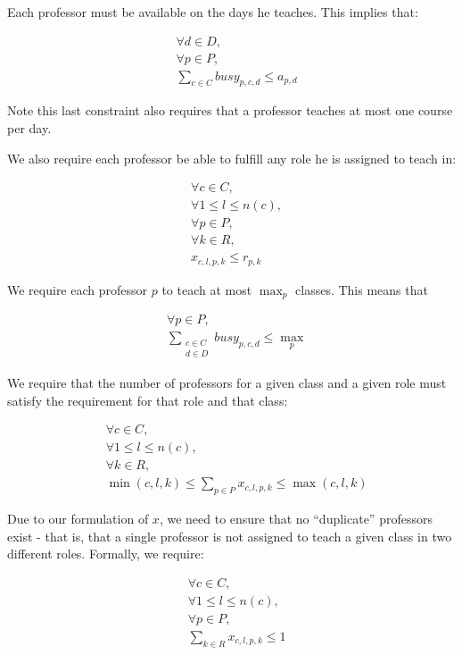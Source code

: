 Each professor must be available on the days he teaches. This implies that:

\begin{align} \label{eq:availability}
  &\forall d \in D,\\
  &\forall p \in P,\\
  &\sum_{c \in C} busy_{p, c, d} \le a_{p, d}
\end{align}

Note this last constraint also requires that a professor teaches at most one course per day.

We also require each professor be able to fulfill any role he is assigned to teach in:

\begin{align} \label{eq:rolevalidity}
  &\forall c \in C,\\
  &\forall 1 \le l \le n(c),\\
  &\forall p \in P,\\
  &\forall k \in R,\\
  &x_{c, l, p, k} \le r_{p, k}
\end{align}

We require each professor $p$ to teach at most $\max_p$ classes. This means that

\begin{align}
  &\forall p \in P,\\
  &\sum_{\substack{c \in C\\d \in D}} busy_{p, c, d} \le \textstyle{\max_p}
\end{align}

We require that the number of professors for a given class and a given role must satisfy the requirement for that role and that class:

\begin{align}\label{eq:classreqs}
  &\forall c \in C,\\
  &\forall 1 \le l \le n(c),\\
  &\forall k \in R,\\
  &\min(c, l, k) \le \sum_{p \in P} x_{c, l, p, k} \le \max(c, l, k)
\end{align}

Due to our formulation of $x$, we need to ensure that no ``duplicate'' professors exist - that is, that a single professor is not assigned to teach a given class in two different roles. Formally, we require:

\begin{align}
  &\forall c \in C,\\
  &\forall 1 \le l \le n(c),\\
  &\forall p \in P,\\
  &\sum_{k \in R} x_{c, l, p, k} \le 1
\end{align}


